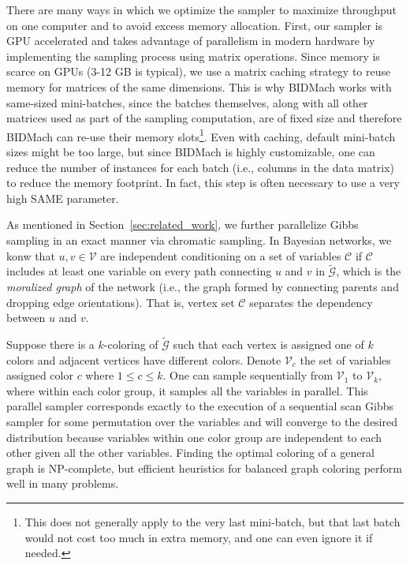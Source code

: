 \documentclass{article} %
\begin{document}
There are many ways in which we optimize the sampler to maximize throughput on one computer and to
avoid excess memory allocation. First, our sampler is GPU accelerated and takes advantage of
parallelism in modern hardware by implementing the sampling process using matrix operations. Since
memory is scarce on GPUs (3-12 GB is typical), we use a matrix caching strategy to reuse memory for
matrices of the same dimensions. This is why BIDMach works with same-sized mini-batches, since the
batches themselves, along with all other matrices used as part of the sampling computation, are of
fixed size and therefore BIDMach can re-use their memory slots\footnote{This does not generally
apply to the very last mini-batch, but that last batch would not cost too much in extra memory, and
one can even ignore it if needed.}. Even with caching, default mini-batch sizes might be too large,
but since BIDMach is highly customizable, one can reduce the number of instances for each batch
(i.e., columns in the data matrix) to reduce the memory footprint. In fact, this step is often
necessary to use a very high SAME parameter.

As mentioned in Section~\ref{sec:related_work}, we further parallelize Gibbs sampling in an
exact manner via chromatic sampling. In Bayesian networks, we konw that $u, v \in \mathcal{V}$ are
independent conditioning on a set of variables $\mathcal{C}$ if $\mathcal{C}$ includes at least one
variable on every path connecting $u$ and $v$ in $\tilde{\mathcal{G}}$, which is the \emph{moralized
graph} of the network (i.e., the graph formed by connecting parents and dropping edge orientations).
That is, vertex set $\mathcal{C}$ separates the dependency between $u$ and $v$.

Suppose there is a $k$-coloring of $\tilde{\mathcal{G}}$ such that each vertex is assigned one of $k$
colors and adjacent vertices have different colors. Denote $\mathcal{V}_c$ the set of variables
assigned color $c$ where $1 \leq c \leq k$. One can sample sequentially from $\mathcal{V}_1$ to
$\mathcal{V}_k$, where within each color group, it samples all the variables in parallel. This
parallel sampler corresponds exactly to the execution of a sequential scan Gibbs sampler for some
permutation over the variables and will converge to the desired distribution because variables
within one color group are independent to each other given all the other variables. Finding the
optimal coloring of a general graph is NP-complete, but efficient heuristics for balanced graph
coloring perform well in many problems.
\end{document}
